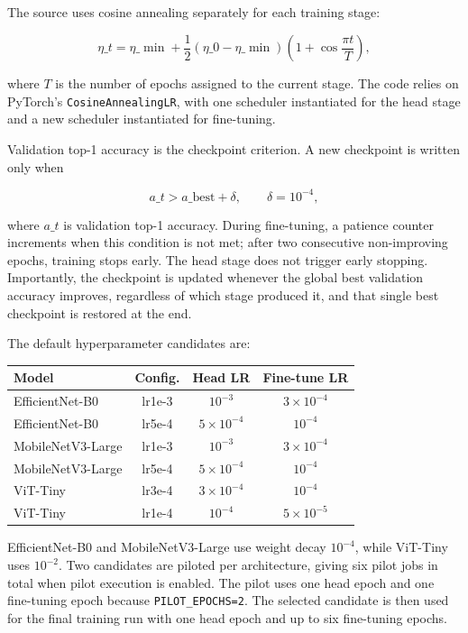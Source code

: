 \documentclass[11pt,a4paper]{article}
\begin{document}
The source uses cosine annealing separately for each training stage:

\begin{equation}
\eta\_t = \eta\_{\min} + \frac{1}{2}(\eta\_0-\eta\_{\min})
\left(1+\cos\frac{\pi t}{T}\right),
\end{equation}

where $T$ is the number of epochs assigned to the current stage. The code relies on PyTorch's \texttt{CosineAnnealingLR}, with one scheduler instantiated for the head stage and a new scheduler instantiated for fine-tuning.

Validation top-1 accuracy is the checkpoint criterion. A new checkpoint is written only when

\begin{equation}
a\_t > a\_{\mathrm{best}} + \delta,
\qquad \delta=10^{-4},
\end{equation}

where $a\_t$ is validation top-1 accuracy. During fine-tuning, a patience counter increments when this condition is not met; after two consecutive non-improving epochs, training stops early. The head stage does not trigger early stopping. Importantly, the checkpoint is updated whenever the global best validation accuracy improves, regardless of which stage produced it, and that single best checkpoint is restored at the end.

The default hyperparameter candidates are:

\begin{center}
\begin{tabular}{lccc}
\toprule
Model & Config. & Head LR & Fine-tune LR \\
\midrule
EfficientNet-B0 & lr1e-3 & $10^{-3}$ & $3\times10^{-4}$ \\
EfficientNet-B0 & lr5e-4 & $5\times10^{-4}$ & $10^{-4}$ \\
MobileNetV3-Large & lr1e-3 & $10^{-3}$ & $3\times10^{-4}$ \\
MobileNetV3-Large & lr5e-4 & $5\times10^{-4}$ & $10^{-4}$ \\
ViT-Tiny & lr3e-4 & $3\times10^{-4}$ & $10^{-4}$ \\
ViT-Tiny & lr1e-4 & $10^{-4}$ & $5\times10^{-5}$ \\
\bottomrule
\end{tabular}
\end{center}

EfficientNet-B0 and MobileNetV3-Large use weight decay $10^{-4}$, while ViT-Tiny uses $10^{-2}$. Two candidates are piloted per architecture, giving six pilot jobs in total when pilot execution is enabled. The pilot uses one head epoch and one fine-tuning epoch because \texttt{PILOT\_EPOCHS=2}. The selected candidate is then used for the final training run with one head epoch and up to six fine-tuning epochs.
\end{document}
